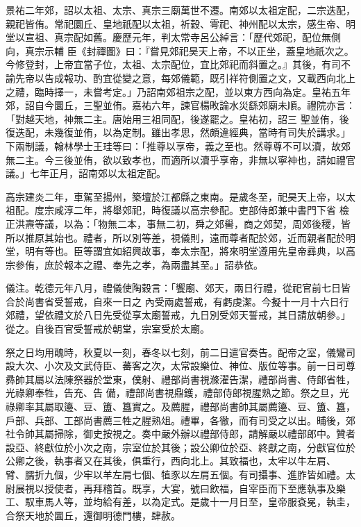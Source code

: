 \begin{pinyinscope}
 景祐二年郊，詔以太祖、太宗、真宗三廟萬世不遷。南郊以太祖定配，二宗迭配，親祀皆侑。常祀圜丘、皇地祇配以太祖，祈穀、雩祀、神州配以太宗，感生帝、明堂以宣祖、真宗配如舊。慶歷元年，判太常寺呂公綽言：「歷代郊祀，配位無側向，真宗示輔
 臣《封禪圖》曰：『嘗見郊祀昊天上帝，不以正坐，蓋皇地祇次之。今修登封，上帝宜當子位，太祖、太宗配位，宜比郊祀而斜置之。』其後，有司不諭先帝以告成報功、酌宜從變之意，每郊儀範，既引祥符側置之文，又載西向北上之禮，臨時擇一，未嘗考定。」乃詔南郊祖宗之配，並以東方西向為定。皇祐五年郊，詔自今圜丘，三聖並侑。嘉祐六年，諫官楊畋論水災繇郊廟未順。禮院亦言：「對越天地，神無二主。唐始用三祖同配，後遂罷之。皇祐初，詔三
 聖並侑，後復迭配，未幾復並侑，以為定制。雖出孝思，然頗違經典，當時有司失於講求。」下兩制議，翰林學士王珪等曰：「推尊以享帝，義之至也。然尊尊不可以瀆，故郊無二主。今三後並侑，欲以致孝也，而適所以瀆乎享帝，非無以寧神也，請如禮官議。」七年正月，詔南郊以太祖定配。



 高宗建炎二年，車駕至揚州，築壇於江都縣之東南。是歲冬至，祀昊天上帝，以太祖配。度宗咸淳二年，將舉郊祀，時復議以高宗參配。吏部侍郎兼中書門下省
 檢正洪燾等議，以為：「物無二本，事無二初，舜之郊嚳，商之郊契，周郊後稷，皆所以推原其始也。禮者，所以別等差，視儀則，遠而尊者配於郊，近而親者配於明堂，明有等也。臣等謂宜如紹興故事，奉太宗配，將來明堂遵用先皇帝彞典，以高宗參侑，庶於報本之禮、奉先之孝，為兩盡其至。」詔恭依。



 儀注。乾德元年八月，禮儀使陶穀言：「饗廟、郊天，兩日行禮，從祀官前七日皆合於尚書省受誓戒，自來一日之
 內受兩處誓戒，有虧虔潔。今擬十一月十六日行郊禮，望依禮文於八日先受從享太廟誓戒，九日別受郊天誓戒，其日請放朝參。」從之。自後百官受誓戒於朝堂，宗室受於太廟。



 祭之日均用醜時，秋夏以一刻，春冬以七刻，前二日遣官奏告。配帝之室，儀鸞司設大次、小次及文武侍臣、蕃客之次，太常設樂位、神位、版位等事。前一日司尊彞帥其屬以法陳祭器於堂東，僕射、禮部尚書視滌濯告潔，禮部尚書、侍郎省牲，光祿卿奉牲，告充、告
 備，禮部尚書視鼎鑊，禮部侍郎視腥熟之節。祭之旦，光祿卿率其屬取籩、豆、簠、簋實之。及薦腥，禮部尚書帥其屬薦籩、豆、簠、簋，戶部、兵部、工部尚書薦三牲之腥熟俎。禮畢，各徹，而有司受之以出。晡後，郊社令帥其屬掃除，御史按視之。奏中嚴外辦以禮部侍郎，請解嚴以禮部郎中。贊者設亞、終獻位於小次之南，宗室位於其後；設公卿位於亞、終獻之南，分獻官位於公卿之後，執事者又在其後，俱重行，西向北上。其致福也，太牢以牛左肩、
 臂、臑折九個，少牢以羊左肩七個、犆豕以左肩五個。有司攝事、進胙皆如禮。太尉展視以授使者，再拜稽首。既享，大宴，號曰飲福，自宰臣而下至應執事及樂工、馭車馬人等，並均給有差，以為定式。是歲十一月日至，皇帝服袞冕，執圭，合祭天地於圜丘，還御明德門樓，肆赦。




\end{pinyinscope}
